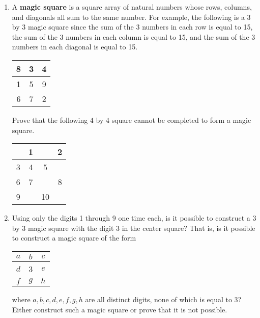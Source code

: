 \begin{enumerate}
\item A \textbf{magic square}
%
is a square array of natural numbers whose rows, columns, and diagonals all sum to the same number.  For example, the following is a 3 by 3 magic square since the sum of the 3 numbers in each row is equal to 15, the sum of the 3 numbers in each column is equal to 15, and the sum of the 3 numbers in each diagonal is equal to 15.
\begin{center}
\begin{tabular}{| c | c | c |} \hline
8  &  3  &  4  \\ \hline
1  &  5  &  9  \\ \hline
6  &  7  &  2  \\ \hline
\end{tabular}
\end{center}
Prove that the following 4 by 4 square cannot be completed to form a magic square.
\begin{center}
\begin{tabular}{| c | c | c | c |} \hline
   &  1  &     &  2  \\ \hline
3  &  4  &  5  &     \\ \hline
6  &  7  &     &  8  \\ \hline
9  &     &  10 &     \\ \hline
\end{tabular}
\end{center}



\item Using only the digits 1 through 9 one time each, is it possible to construct a 3 by 3 magic square with the digit 3 in the center square?  That is, is it possible to construct a magic square of the form

\begin{center}
\begin{tabular}{| c | c | c |} \hline
$a$  &  $b$  &  $c$  \\ \hline
$d$  &   3   &  $e$  \\ \hline
$f$  &  $g$  &  $h$  \\ \hline
\end{tabular}
\end{center}

\noindent
where $a, b, c, d, e, f, g, h$ are all distinct digits, none of which is equal to 3?  Either construct such a magic square or prove that it is not possible.



\end{enumerate}
